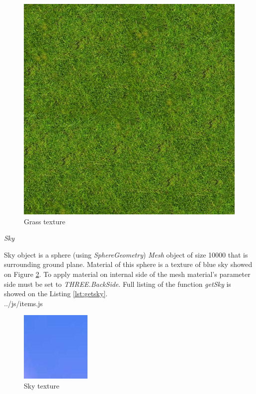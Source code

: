 \documentclass[12pt]{article}
\begin{document}
\begin{figure}[h!]
\begin{center}
\includegraphics[scale=0.3]{../images/grasslight-small.jpg}
\end{center}
\caption{Grass texture}
\label{grass1}
\end{figure}

\textit{Sky}
\par
Sky object is a sphere (using \textit{SphereGeometry}) \textit{Mesh} object of size 10000 that is surrounding ground plane. Material of this sphere is a texture of blue sky showed on Figure \ref{sky1}. To apply material on internal side of the mesh material's parameter side must be set to \textit{THREE.BackSide}. Full listing of the function \textit{getSky} is showed on the Listing \ref{lst:getsky}.
\\

{../js/items.js}

\begin{figure}[h!]
\begin{center}
\includegraphics[scale=1.0]{../images/sky.jpg}
\end{center}
\caption{Sky texture}
\label{sky1}
\end{figure}
\end{document}
